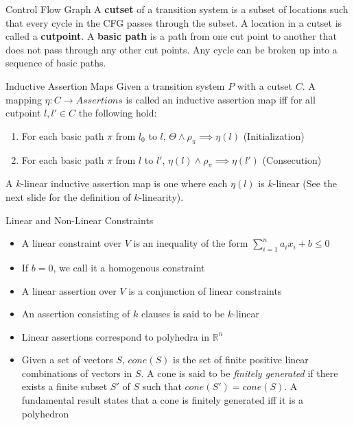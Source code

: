\documentclass{beamer}
\begin{document}
{\begin{frame}{Control Flow Graph}
            A \textbf{cutset} of a transition system is a subset of locations such that every cycle in the CFG passes through the subset. A location in a cutset is called a \textbf{cutpoint}. A \textbf{basic path} is a path from one cut point to another that does not pass through any other cut points. Any cycle can be broken up into a sequence of basic paths.
        \end{frame}
        \begin{frame}{Inductive Assertion Maps}
            Given a transition system $P$ with a cutset $C$. A mapping $\eta : C \rightarrow Assertions$ is called an inductive assertion map iff for all cutpoint $l,  l' \in C$ the following hold:
            \begin{enumerate}
                \item For each basic path $\pi$ from $l_{0}$ to $l$, $\Theta \land \rho_{\pi} \implies \eta(l)$ (Initialization)
                \item For each basic path $\pi$ from $l$ to $l'$, $\eta(l) \land \rho_{\pi} \implies \eta(l')$ (Consecution)
            \end{enumerate}
            A $k$-linear inductive assertion map is one where each $\eta(l)$ is $k$-linear (See the next slide for the definition of $k$-linearity).
        \end{frame}
        \begin{frame}{Linear and Non-Linear Constraints}
            \begin{itemize}
                \item A linear constraint over $V$ is an inequality of the form $\sum\limits_{i = 1}^{n} a_{i}x_{i} + b \leq 0$
                \item If $b = 0$, we call it a homogenous constraint
                \item A linear assertion over $V$ is a conjunction of linear constraints
                \item An assertion consisting of $k$ clauses is said to be $k$-linear
                \item Linear assertions correspond to polyhedra in $\mathbb{R}^n$
                \item Given a set of vectors $S$, $cone(S)$ is the set of finite positive linear combinations of vectors in $S$. A cone is said to be \textit{finitely generated} if there exists a finite subset $S'$ of $S$ such that $cone(S') = cone(S)$. A fundamental result states that a cone is finitely generated iff it is a polyhedron

\end{itemize}
\end{frame}}
\end{document}

